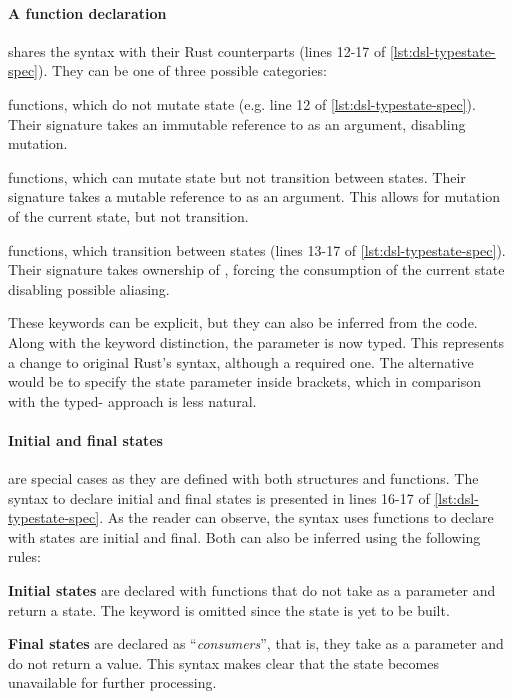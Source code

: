 \paragraph{A function declaration} shares the syntax with their Rust counterparts (lines 12-17 of \autoref{lst:dsl-typestate-spec}).
They can be one of three possible categories:
\begin{compactitem}
    \item {} functions, which do not mutate state (e.g. line 12 of \autoref{lst:dsl-typestate-spec}).
    Their signature takes an immutable reference to  as an argument,
    disabling mutation.
    \item {} functions, which can mutate state but not transition between states.
    Their signature takes a mutable reference to  as an argument.
    This allows for mutation of the current state, but not transition.
    \item {} functions, which transition between states (lines 13-17 of \autoref{lst:dsl-typestate-spec}).
    Their signature takes ownership of ,
    forcing the consumption of the current state disabling possible aliasing.
\end{compactitem}
These keywords can be explicit, but they can also be inferred from the code.
Along with the keyword distinction, the  parameter is now typed.
This represents a change to original Rust's syntax, although a required one.
The alternative would be to specify the state parameter inside brackets,
which in comparison with the typed- approach is less natural.

\paragraph{Initial and final states} are special cases as they are defined with both structures and functions.
The syntax to declare initial and final states is presented in lines 16-17 of \autoref{lst:dsl-typestate-spec}.
As the reader can observe, the syntax uses functions to declare with states are initial and final.
Both can also be inferred using the following rules:
\begin{compactitem}
    \item \textbf{Initial states} are declared with functions that do not take  as a parameter and return a state.
    The  keyword is omitted since the state is yet to be built.
    \item \textbf{Final states} are declared as “\emph{consumers}”, that is, they take  as a parameter and do not return a value.
    This syntax makes clear that the state becomes unavailable for further processing.
\end{compactitem}


